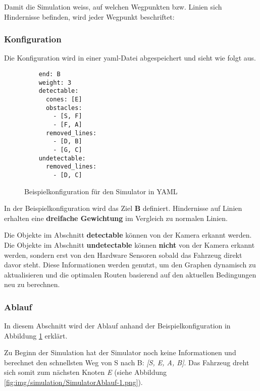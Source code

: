 \documentclass[../main.tex]{subfiles}
\begin{document}
Damit die Simulation weiss, auf welchen Wegpunkten bzw. Linien sich Hindernisse befinden, wird jeder Wegpunkt beschriftet:


\subsubsection{Konfiguration} \label{sim:Konfiguration}

Die Konfiguration wird in einer \acrshort{yaml}-Datei abgespeichert und sieht wie folgt aus.
\begin{figure}[H]
    \centering
    \begin{verbatim}
    end: B
    weight: 3
    detectable:
      cones: [E]
      obstacles: 
        - [S, F]
        - [F, A]
      removed_lines:
        - [D, B]
        - [G, C]
    undetectable:
      removed_lines:
        - [D, C]
    \end{verbatim}
    \caption{Beispielkonfiguration für den Simulator in YAML}
    \label{fig:Beispielkonfiguration}
\end{figure}

In der Beispielkonfiguration wird das Ziel \textbf{B} definiert. Hindernisse auf Linien erhalten eine \textbf{dreifache Gewichtung} im Vergleich zu normalen Linien.

Die Objekte im Abschnitt \textbf{detectable} können von der Kamera erkannt werden.
Die Objekte im Abschnitt \textbf{undetectable} können \textbf{nicht} von der Kamera erkannt werden, sondern erst von den Hardware Sensoren sobald das Fahrzeug direkt davor steht.
Diese Informationen werden genutzt, um den Graphen dynamisch zu aktualisieren und die optimalen Routen basierend auf den aktuellen Bedingungen neu zu berechnen.

\subsubsection{Ablauf}

In diesem Abschnitt wird der Ablauf anhand der Beispielkonfiguration in Abbildung \ref{fig:Beispielkonfiguration} erklärt.

Zu Beginn der Simulation hat der Simulator noch keine Informationen und berechnet den schnellsten Weg von S nach B: \textit{[S, E, A, B]}. Das Fahrzeug dreht sich somit zum nächsten Knoten \textit{E} (siehe Abbildung \ref{fig:img/simulation/SimulatorAblauf-1.png}).
\end{document}
